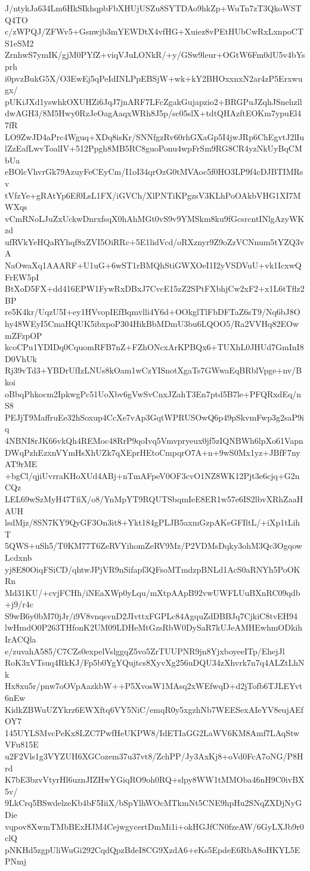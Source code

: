 J/ntykJa634Lm6HkSIkhqpbFbXHUjUSZu8SYTDAo9hkZp+WuTn7zT3QkoWSTQ4TO
c/zWPQJ/ZFWv5+Gsnwjb3mYEWDtX4vfHG+Xuiez8vPEtHUbCwRxLxnpoCTS1eSM2
ZrnhwS7ymIK/gjM0PYfZ+viqVJuLONkR/+y/GSw9leur+OGtW6Fm0dU5v4bYsprh
i0pvzBukG5X/O3EwEj5qPeIdINLPpEBSjW+wk+kY2BHOxxnxN2ar4zP5Erxwugx/
pUKiJXd1yswhkOXUHZi6JqJ7jnARF7LFcZgakGujapzio2+BRGPuJZqhJSnehzll
dwAGH3/8M5Hwy0RzJeOagAaqxWRh8J5p/sc05slX+tdtQHAzftEOKm7ypuEl47fR
LO9ZwJD4aPrc4Wguq+XDq8isKr/SNNfgzRv60rhGXaGp5I4jwJRp6ChEgvtJ2lIu
lZzEafLwvToalIV+512Ppgh8MB5RC8guoPonu4wpFrSm9RG8CR4yzNkUyBqCMbUa
eBOlcVhvrGk79AzuyFeCEyCm/I1oI34qrOzG0tMVAoc5f0HO3LP9f4cDJBTIMRsv
tVfzYe+gRAtYp6Ef0LsL1FX/iGVCh/XlPNTiKPgzsV3KLhPoOAkbVHG1XI7MWXqs
vCmRNoLJuZxUckwDnrxfsqX0hAhMGt0vS9v9YMSkm8ku9fGcsrcntINlgAzyWKzd
ufRVkYeHQaRYhqf8xZVI5OiRRc+5E1lidVcd/oRXznyr9Z9oZzVCNnum5tYZQ3vA
NaOwaXq1AAARF+U1uG+6wST1rBMQhStiGWXOeI1I2yVSDVuU+vk1IcxwQFrEW5pI
BtXoD5FX+dd416EPW1FywRxDBxJ7CvcE15zZ2SPtFXbhjCw2xF2+x1L6tTflz2BP
re5K4kr/UqzU5I+ey1HVvopIEfBqmvlli4Y6d+OOkglTlFbDFTaZ6sT9/Nq6bJ8O
hy48WEyI5CmaHQUK5ibxpoP304HikBbMDmU3bu6LQOO5/Ra2VVHq82EOwmZFzpOP
kcoCPu1YDIDq0CquomRFB7nZ+FZhONcxArKPBQx6+TUXhL0JHUd7GmInI8D0VhUk
Rj39vTd3+YBDrUfIzLNUs8kOam1wCzYISnotXgaTs7GWwaEqBRblVpge+nv/Bkoi
oBbqPhkocm2IpkwgPc51UoXbv6gVwSvCnxJZahT3En7ptd5B7le+PFQRxdEq/nS8
PEJjT9MaffruEe32hSoxup4CcXe7vAp3GqtWPRUSOwQ6p49pSkvmFwp3g2saP9iq
4NBNI8rJK66vkQh4REMoc48RrP9qoIvq5Vmvpryeux0jf5zIQNBWh6lpXo61Vapn
DWqPzhEzxnVYmHsXhUZk7qXEprHEtoCmpqrO7A+n+9wS0Mx1yz+JBfF7nyAT9rME
+bgCl/qjiUvrraKHoXUd4ABj+nTmAFpeV0OF3cvO1NZ8WK12Pjt3e6cjq+G2nCQz
LEL69wSzMyH47TfiX/o8/YnMpYT9RQUTSbqmIeE8ER1w57e6IS2lbvXRhZaaHAUH
lsdMjz/8SN7KY9QyGF3On3it8+Ykt184gPLJB5axmGzpAKeGFIltL/+iXp1tLihT
5QWS+uSh5/T0KM77T6ZeRVYihomZeRV9Mz/P2VDMsDqky3ohM3Qc3OgqowLcdxnb
yj8E80OiqFSiCD/qhtwJPjVR9nSifapf3QFsoMTmdzpBNLd1AcS0aRNYh5PoOKRn
Md31KU/+cvjFCHh/iNEaXWp0yLqu/mXtpAApB92vwUWFLUuBXnRC09qdb+j9/r4c
S9wB6y0bM70jJr/i9V8vnqsvnD2JIvttxFGPLc84AgquZdDBBJq7CjkiC8tvEH94
lwHmdO0P263THfonK2UM09LDHeMtGzsRbW0DySaR7kUJeAMHEwhmODkihIrACQla
e/zuvahA585/C7CZs0expelVslggqZ5vo5ZrTUUPNR9jn8YjxboyeeITp/EhejJl
RoK3xVTsuq4RkKJ/Fp5b0YgYQujtcs8XyvXg256uDQU34zXhvrk7n7q4ALZtLhNk
Hx8xu5r/pnw7oOVpAazkbW++P5XvosW1MAsq2xWEfwqD+d2jTofb6TJLEYvt6nEw
KidkZBWuUZYkrz6EWXftq6VY5NiC/emqR0y5xgzhNb7WEESexAIeYV8eujAEfOY7
145UYLSMvcPeKx8LZC7PwfHeUKPW8/IdETIaGG2LaWV6KM8Amf7LAqStwVFu815E
u2F2Vls1g3VYZUH6XGCozem37u37vt8/ZchPP/Jy3AxKj8+oVd0FcA7oNG/P8Hrd
K7bE3bzvVtyrHl6uznJIZHwYGiqRO9oh0RQ+slpy8WW1tMMOba46nH9C0ivBX5v/
9LkCrq5BSwdelzeKb4bF5IiiX/bSpYlhWOcMTkmNt5CNE9hpHu2SNqZXDjNyGDie
vqpov8XwmTMbBExHJM4CejwgycertDmMi1i+okHGJfCN0fzeAW/6GyLXJb9r0clQ
pNKHd5zgpUliWuGi292CqdQpzBdeI8CG9XzdA6+eKs5EpdeE6RbA8oHKYL5EPNmj
